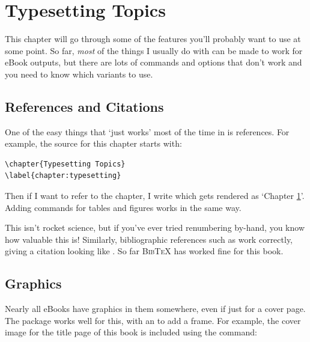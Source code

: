 \chapter{Typesetting Topics}
\label{chapter:typesetting}

This chapter will go through some of the \tex features you'll probably want to use at some point.
So far, {\em most} of the things I usually do with \tex can be made to work for eBook outputs,
but there are lots of commands and options that don't work and you need to know which
variants to use.

\section{References and Citations}

One of the easy things that `just works' most of the time in \latex is references. For example,
the \tex source for this chapter starts with:

\begin{verbatim}
\chapter{Typesetting Topics}
\label{chapter:typesetting}
\end{verbatim}

Then if I want to refer to the chapter, I write  which
gets rendered as `Chapter \ref{chapter:typesetting}'. Adding  commands for tables and figures
works in the same way.

This isn't rocket science, but if you've ever tried
renumbering by-hand, you know how valuable this is! Similarly, bibliographic references such as
 work correctly, giving a citation looking like \cite{knuth1984texbook}.
So far \textsc{BibTeX} has worked fine for this book.

\section{Graphics}

Nearly all eBooks have graphics in them somewhere, even if just for a cover page. 
The  package works well for this, with an  to add a frame.
For example, the cover image for the title page of this book is included using the command:

